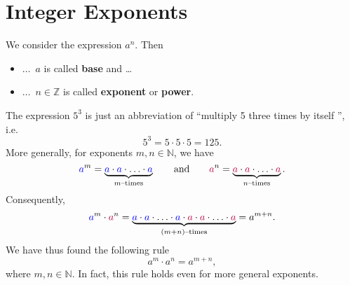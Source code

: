 \section*{Integer Exponents}
\begin{tcolorbox}
	We consider the expression $a^n$. Then
	\begin{itemize}
		\item[] $\ldots$\ $a$ is called \textbf{base} and \ldots
		\item[] $\ldots$\ $n\in\mathbb Z$ is called \textbf{exponent} or \textbf{power}.
	\end{itemize}
\end{tcolorbox}
The expression $5^3$ is just an abbreviation of ``multiply 5 three times by itself '', i.e.
\begin{equation*}
	5^3=5\cdot 5\cdot 5=125.
\end{equation*}
More generally, for exponents $m,n\in\mathbb N$, we have
\begin{equation*}
	\textcolor{blue}{a}^m=\underbrace{\textcolor{blue}{a}\cdot\textcolor{blue}{a}\cdot\ldots\cdot\textcolor{blue}{a}}_{m\text{--times}}
	\qquad\text{and}\qquad
	\textcolor{purple}{a}^n=\underbrace{\textcolor{purple}{a}\cdot\textcolor{purple}{a}\cdot\ldots\cdot\textcolor{purple}{a}}_{n\text{--times}}.
\end{equation*}
Consequently,
\begin{equation*}
	\textcolor{blue}{a}^m\cdot\textcolor{purple}{a}^n
	=\underbrace{\textcolor{blue}{a}\cdot\textcolor{blue}{a}\cdot\ldots\cdot\textcolor{blue}{a}
	\cdot\textcolor{purple}{a}\cdot\textcolor{purple}{a}\cdot\ldots\cdot\textcolor{purple}{a}}_{(m+n)\text{--times}}
	=a^{m+n}.
\end{equation*}
We have thus found the following rule
\begin{equation*}
	a^m\cdot a^n=a^{m+n},
\end{equation*}
where $m,n\in\mathbb N$.
In fact, this rule holds even for more general exponents.
